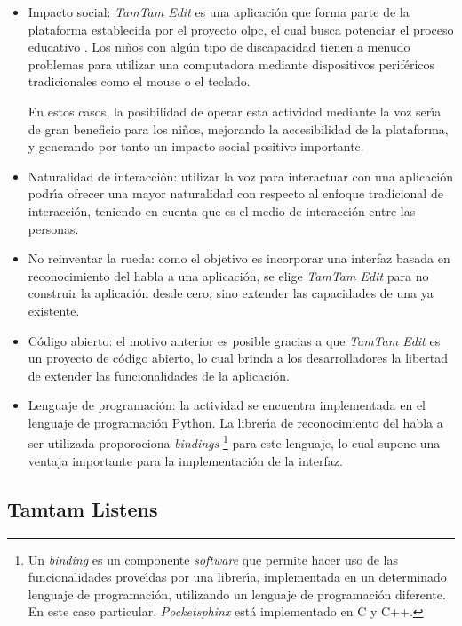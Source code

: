 \begin{itemize}
    \item Impacto social: \emph{TamTam Edit} es una aplicaci\'on que forma parte de la plataforma establecida
    por el proyecto \gls{olpc}, el cual busca potenciar el proceso educativo \cite{OLPC}. 
    Los ni\~nos con alg\'un tipo de discapacidad tienen a menudo problemas para utilizar una computadora mediante
    dispositivos perif\'ericos tradicionales como el mouse o el teclado.

    En estos casos, la posibilidad de operar esta actividad mediante la voz ser{\'\i}a de gran beneficio 
    para los ni\~nos, mejorando la accesibilidad de la plataforma, y generando por tanto un impacto social
    positivo importante.
    \item Naturalidad de interacci\'on: utilizar la voz para interactuar con una aplicaci\'on podr{\'\i}a
    ofrecer una mayor naturalidad con respecto al enfoque tradicional de interacci\'on, teniendo en cuenta
    que es el medio de interacci\'on entre las personas.
    \item No reinventar la rueda: como el objetivo es incorporar una interfaz basada en reconocimiento del
    habla a una aplicaci\'on, se elige \emph{TamTam Edit} para no construir la aplicaci\'on desde cero,
    sino extender las capacidades de una ya existente.
    \item C\'odigo abierto: el motivo anterior es posible gracias a que \emph{TamTam Edit} es un 
    proyecto de c\'odigo abierto, lo cual brinda a los desarrolladores la libertad de extender las 
    funcionalidades de la aplicaci\'on.
    \item Lenguaje de programaci\'on: la actividad se encuentra implementada en el lenguaje de 
    programaci\'on Python. La librer{\'\i}a de reconocimiento del habla a ser utilizada proporociona 
    \emph{bindings} 
    \footnote{Un \emph{binding} es un componente \emph{software}
   que permite hacer uso de las funcionalidades prove{\'\i}das por una librer{\'\i}a, implementada
    en un determinado lenguaje de programaci\'on, utilizando un lenguaje de programaci\'on diferente. 
    En este caso particular, \emph{Pocketsphinx} est\'a implementado en C y C++.} para 
    este lenguaje, lo cual supone una ventaja importante para la implementaci\'on de la interfaz.
\end{itemize}

\subsection{Tamtam Listens}
\label{sec:tamtam-listens}

